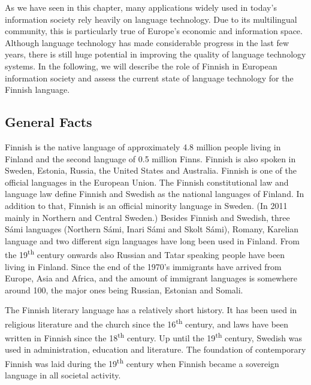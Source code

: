 \documentclass[]{../../metanetpaper}
\begin{document}
\begin{multicols}{2}
As we have seen in this chapter, many applications widely used in today’s
information society rely heavily on language technology. Due to its
multilingual community, this is particularly true of Europe’s economic and
information space. Although language technology has made considerable progress
in the last few years, there is still huge potential in improving the quality
of language technology systems. In the following, we will describe the role of
Finnish in European information society and assess the current state of
language technology for the Finnish language.

\end{multicols}
\clearpage
{}
\begin{multicols}{2}
\subsection{General Facts}


Finnish is the native language of approximately 4.8 million people living in
Finland and the second language of 0.5 million Finns. Finnish is also spoken in
Sweden, Estonia, Russia, the United States and Australia.
Finnish is one of the official languages in the European Union. The Finnish
constitutional law and language law define Finnish and Swedish as the national
languages of Finland. In addition to that, Finnish is an official minority
language in Sweden. (In 2011 mainly in Northern and Central Sweden.) Besides
Finnish and Swedish, three Sámi languages (Northern Sámi, Inari Sámi and Skolt
Sámi), Romany, Karelian language and two different sign languages have long
been used in Finland. From the 19\textsuperscript{th} century onwards also Russian and Tatar
speaking people have been living in Finland. Since the end of the 1970’s
immigrants have arrived from Europe, Asia and Africa, and the amount of
immigrant languages is somewhere around 100, the major ones being Russian,
Estonian and Somali.

The Finnish literary language has a relatively short history. It has been used
in religious literature and the church since the 16\textsuperscript{th} century, and laws have
been written in Finnish since the 18\textsuperscript{th} century. Up until the 19\textsuperscript{th} century,
Swedish was used in administration, education and literature. The foundation of
contemporary Finnish was laid during the 19\textsuperscript{th} century when Finnish became a
sovereign language in all societal activity.


\end{multicols}
\end{document}
